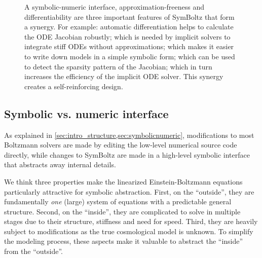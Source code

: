 \documentclass{aa}
\begin{document}
\begin{figure}
    \centering
    \caption{%
        A symbolic-numeric interface, approximation-freeness and differentiability are three important features of SymBoltz that form a synergy.
        For example: automatic differentiation helps to calculate the ODE Jacobian robustly; which is needed by implicit solvers to integrate stiff ODEs without approximations; which makes it easier to write down models in a simple symbolic form; which can be used to detect the sparsity pattern of the Jacobian; which in turn increases the efficiency of the implicit ODE solver.
        This synergy creates a self-reinforcing design.
    }
    \label{fig:synergy}
\end{figure}

\subsection{Symbolic vs. numeric interface}
\label{sec:symbolic_vs_numeric}

As explained in \cref{sec:intro_structure,sec:symbolicnumeric}, modifications to most Boltzmann solvers are made by editing the low-level numerical source code directly, while changes to SymBoltz are made in a high-level symbolic interface that abstracts away internal details.

We think three properties make the linearized Einstein-Boltzmann equations particularly attractive for symbolic abstraction.
First, on the \enquote{outside}, they are fundamentally \emph{one} (large) system of equations with a predictable general structure.
Second, on the \enquote{inside}, they are complicated to solve in multiple stages due to their structure, stiffness and need for speed.
Third, they are heavily subject to modifications as the true cosmological model is unknown.
To simplify the modeling process, these aspects make it valuable to abstract the \enquote{inside} from the \enquote{outside}.
\end{document}
